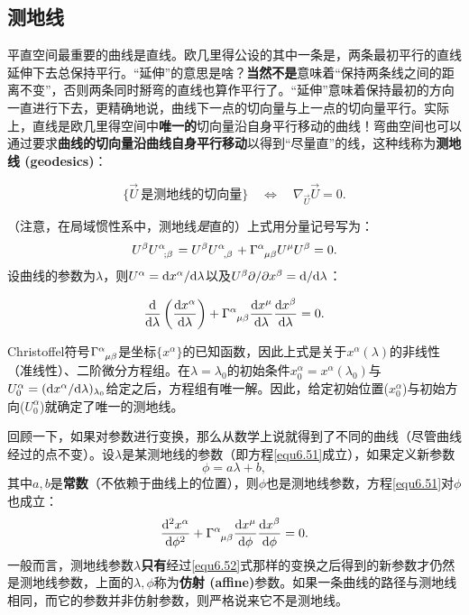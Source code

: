 \subsection*{测地线}
平直空间最重要的曲线是直线。欧几里得公设的其中一条是，两条最初平行的直线延伸下去总保持平行。“延伸”的意思是啥？\textbf{当然不是}意味着“保持两条线之间的距离不变”，否则两条同时掰弯的直线也算作平行了。“延伸”意味着保持最初的方向一直进行下去，更精确地说，曲线下一点的切向量与上一点的切向量平行。实际上，直线是欧几里得空间中\textbf{唯一的}切向量沿自身平行移动的曲线！弯曲空间也可以通过要求\textbf{曲线的切向量沿曲线自身平行移动}以得到“尽量直”的线，这种线称为\textbf{测地线 (geodesics)}：
\begin{shaded}
\begin{equation}
    \{ \vec{U}\ \text{是测地线的切向量} \} \quad \Leftrightarrow \quad \nabla_{\vec{U}} \vec{U} = 0.
\label{equ6.49}
\end{equation}
\end{shaded}
（注意，在局域惯性系中，测地线\textit{是}直的）上式用分量记号写为：
\begin{equation}
    U^\beta U\indices{^\alpha_{; \beta}} = U^\beta U\indices{^\alpha_{, \beta}} + \Gamma\indices{^\alpha_{\mu \beta}} U^\mu U^\beta = 0.
\label{equ6.50}
\end{equation}
设曲线的参数为$\lambda$，则$U^\alpha = \mathrm{d} x^\alpha / \mathrm{d} \lambda$以及$U^\beta \partial / \partial x^\beta = \mathrm{d} / \mathrm{d} \lambda$：
\begin{shaded}
\begin{equation}
    \frac{\rd}{\rd \lambda} \left( \frac{\rd x^\alpha}{\rd \lambda} \right) + \Gamma\indices{^\alpha_{\mu \beta}} \frac{\rd x^\mu}{\rd \lambda} \frac{\rd x^\beta}{\rd \lambda} = 0.
\label{equ6.51}
\end{equation}
\end{shaded}
Christoffel符号$\Gamma\indices{^\alpha_{\mu \beta}}$是坐标$\{ x^\alpha \}$的已知函数，因此上式是关于$x^\alpha (\lambda)$的非线性（准线性）、二阶微分方程组。在$\lambda = \lambda_0$的初始条件$x_0^\alpha = x^\alpha (\lambda_0)$与$U_0^\alpha = (\mathrm{d} x^\alpha / \mathrm{d} \lambda)_{\lambda_0}$给定之后，方程组有唯一解。因此，给定初始位置($x^\alpha_0$)与初始方向($U^\alpha_0$)就确定了唯一的测地线。

回顾一下，如果对参数进行变换，那么从数学上说就得到了不同的曲线（尽管曲线经过的点不变）。设$\lambda$是某测地线的参数（即方程\eqref{equ6.51}成立），如果定义新参数
\begin{equation}
    \phi = a\lambda + b,
\label{equ6.52}
\end{equation}
其中$a, b$是\textbf{常数}（不依赖于曲线上的位置），则$\phi$也是测地线参数，方程\eqref{equ6.51}对$\phi$也成立：
\[
    \frac{\rd^2 x^\alpha}{\rd \phi^2} + \Gamma\indices{^\alpha_{\mu \beta}} \frac{\rd x^\mu}{\rd \phi} \frac{\rd x^\beta}{\rd \phi} = 0.
\]
一般而言，测地线参数$\lambda$\textbf{只有}经过\eqref{equ6.52}式那样的变换之后得到的新参数才仍然是测地线参数，上面的$\lambda, \phi$称为\textbf{仿射 (affine)}参数。如果一条曲线的路径与测地线相同，而它的参数并非仿射参数，则严格说来它不是测地线。

